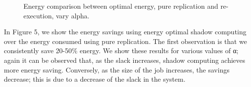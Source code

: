 \begin{figure*}[hHtb]
\centering
{}
\caption { Energy comparison between optimal energy, pure replication and re-execution, vary alpha.}
\label{energy_savings_opt_replication_rexecution_grid}
\end{figure*}

In Figure 5, we show the energy savings using energy optimal shadow
computing over the energy consumed using pure replication. The first
observation is that we consistently save 20-50\% energy. We show these
results for various values of α; again it can be observed that, as the
slack increases, shadow computing achieves more energy
saving. Conversely, as the size of the job increases, the savings
decrease; this is due to a decrease of the slack in the system.


